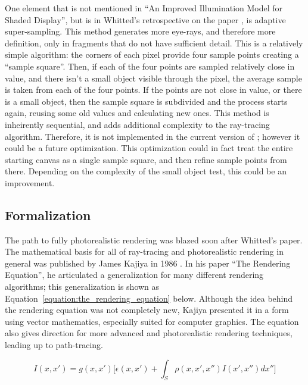 One element that is not mentioned in ``An Improved Illumination Model for Shaded Display'', but is in Whitted's retrospective on the paper \cite{whitted2018explains}, is adaptive super-sampling.
This method generates more eye-rays, and therefore more definition, only in fragments that do not have sufficient detail.
This is a relatively simple algorithm: the corners of each pixel provide four sample points creating a ``sample square''.
Then, if each of the four points are sampled relatively close in value, and there isn't a small object visible through the pixel, the average sample is taken from each of the four points.
If the points are not close in value, or there is a small object, then the sample square is subdivided and the process starts again, reusing some old values and calculating new ones.
This method is inheirently sequential, and adds additional complexity to the ray-tracing algorithm.
Therefore, it is not implemented in the current version of \name; however it could be a future optimization.
This optimization could in fact treat the entire starting canvas as a single sample square, and then refine sample points from there.
Depending on the complexity of the small object test, this could be an improvement.

\subsection{Formalization}
\label{ch:relatedwork:discovery:formalization}

The path to fully photorealistic rendering was blazed soon after Whitted's paper.
The mathematical basis for all of ray-tracing and photorealistic rendering in general was published by James Kajiya in 1986 \cite{kajiya1986rendering}.
In his paper ``The Rendering Equation'', he articulated a generalization for many different rendering algorithms; this generalization is shown as Equation~\ref{equation:the_rendering_equation} below.
Although the idea behind the rendering equation was not completely new, Kajiya presented it in a form using vector mathematics, especially suited for computer graphics.
The equation also gives direction for more advanced and photorealistic rendering techniques, leading up to path-tracing.

\begin{equation}
  \label{equation:the_rendering_equation}
  I(x, x') = g(x, x') \Big[\epsilon(x, x') + \int_{S} \rho(x, x',x'')I(x', x'')dx''\Big]
\end{equation}

